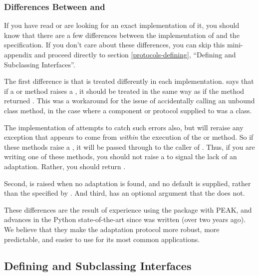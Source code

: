 \subsubsection{Differences Between  and }

If you have read  or are looking for an exact implementation of it,
you should know that there are a few differences between the 
implementation of  and the  specification.  If you
don't care about these differences, you can skip this mini-appendix and
proceed directly to section \ref{protocols-defining}, ``Defining and Subclassing
Interfaces''.

The first difference is that  is treated differently in
each implementation.   says that if a  or
 method raises a , it should be
treated in the same way as if the method returned .  This was
a workaround for the issue of accidentally calling an unbound class
method, in the case where a component or protocol supplied to
 was a class.

The  implementation of  attempts to catch
such errors also, but will reraise any exception that appears to come from
\emph{within} the execution of the  or
 method.  So if these methods raise a ,
it will be passed through to the caller of .  Thus, if you
are writing one of these methods, you should not raise a 
to signal the lack of an adaptation.  Rather, you should return .

Second,  is raised when no adaptation is
found, and no default is supplied, rather than the 
specified by .  And third,  has an optional
 argument that the   does not.

These differences are the result of experience using the 
package with PEAK, and advances in the Python state-of-the-art since
 was written (over two years ago).  We believe that they make the
adaptation protocol more robust, more predictable, and easier to use for
its most common applications.






\subsection{Defining and Subclassing Interfaces \label{protocols-defining}}

